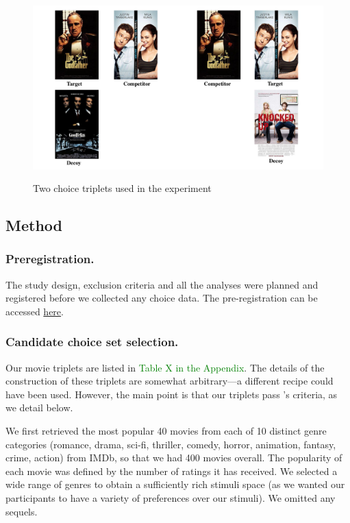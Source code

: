 \documentclass[12pt, a4paper]{article}
\newcommand{\NS}[1] {{\textcolor{green}{#1}}}
\begin{document}
\begin{figure}
\centering
\captionsetup{justification=centering}
		 \caption{Two choice triplets used in the experiment}
\includegraphics[width=1\textwidth]{figure1.pdf}
\label{fig:quadruplets}
\end{figure}

\subsection*{Method}

\subsubsection*{Preregistration.}
The study design, exclusion criteria and all the analyses were planned and registered before we collected any choice data. The pre-registration can be accessed \href{https://osf.io/fme6c/?view_only=31da4193689f4247a76af93b2f98fcef}{here}.

\subsubsection*{Candidate choice set selection.}

Our movie triplets are listed in \NS{Table X in the Appendix}. The details of the construction of these triplets are somewhat arbitrary---a different recipe could have been used. However, the main point is that our triplets pass \citeauthor{Huber2014}'s \citeyear{Huber2014} criteria, as we detail below.

We first retrieved the most popular 40 movies from each of 10 distinct genre categories (romance, drama, sci-fi, thriller, comedy, horror, animation, fantasy, crime, action) from IMDb, so that we had 400 movies overall. The popularity of each movie was defined by the number of ratings it has received. We selected a wide range of genres to obtain a sufficiently rich stimuli space (as we wanted our participants to have a variety of preferences over our stimuli). We omitted any sequels.
\end{document}

